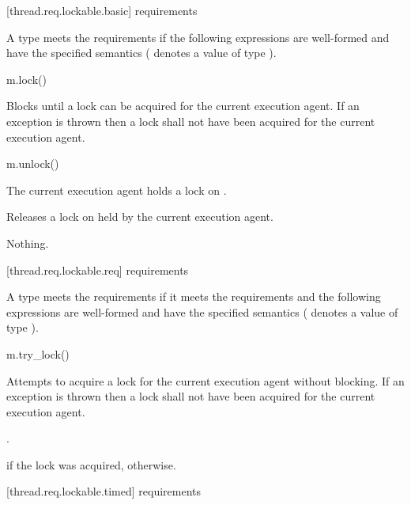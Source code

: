 [thread.req.lockable.basic]{ requirements}

\pnum
A type  meets the  requirements if the following expressions are
well-formed and have the specified semantics ( denotes a value of type ).

\begin{itemdecl}
m.lock()
\end{itemdecl}

\begin{itemdescr}
\pnum
{}%
\effects
Blocks until a lock can be acquired for the current execution agent. If an exception
is thrown then a lock shall not have been acquired for the current execution agent.
\end{itemdescr}

\begin{itemdecl}
m.unlock()
\end{itemdecl}

\begin{itemdescr}
\pnum
\expects
The current execution agent holds a lock on .

\pnum
\effects
Releases a lock on  held by the current execution agent.

\pnum
\throws
Nothing.
\end{itemdescr}

[thread.req.lockable.req]{ requirements}

\pnum
A type  meets the  requirements if it meets the 
requirements and the following expressions are well-formed and have the specified semantics
( denotes a value of type ).

\begin{itemdecl}
m.try_lock()
\end{itemdecl}

\begin{itemdescr}
\pnum
\effects
Attempts to acquire a lock for the current execution agent without blocking. If an
exception is thrown then a lock shall not have been acquired for the current execution agent.

\pnum
\returntype {}.

\pnum
\returns
{} if the lock was acquired,  otherwise.
\end{itemdescr}

[thread.req.lockable.timed]{ requirements}

